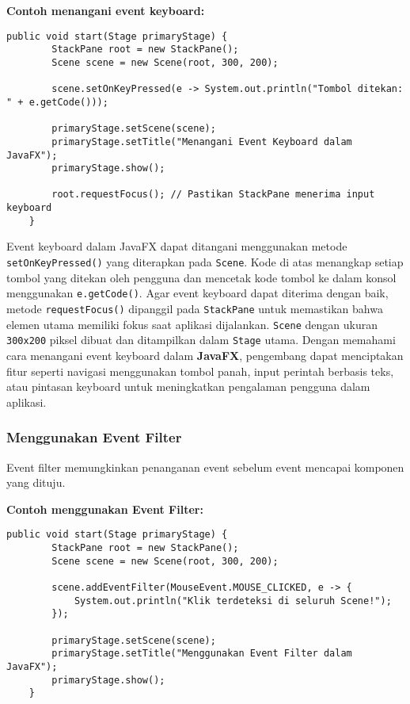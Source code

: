 \textbf{Contoh menangani event keyboard:}
\begin{lstlisting}[style=JavaStyle, caption=Menggunakan event keyboard dalam JavaFX]
	public void start(Stage primaryStage) {
		StackPane root = new StackPane();
		Scene scene = new Scene(root, 300, 200);
		
		scene.setOnKeyPressed(e -> System.out.println("Tombol ditekan: " + e.getCode()));
		
		primaryStage.setScene(scene);
		primaryStage.setTitle("Menangani Event Keyboard dalam JavaFX");
		primaryStage.show();
		
		root.requestFocus(); // Pastikan StackPane menerima input keyboard
	}
\end{lstlisting}

Event keyboard dalam JavaFX dapat ditangani menggunakan metode \texttt{setOnKeyPressed()} yang diterapkan pada \texttt{Scene}. Kode di atas menangkap setiap tombol yang ditekan oleh pengguna dan mencetak kode tombol ke dalam konsol menggunakan \texttt{e.getCode()}. Agar event keyboard dapat diterima dengan baik, metode \texttt{requestFocus()} dipanggil pada \texttt{StackPane} untuk memastikan bahwa elemen utama memiliki fokus saat aplikasi dijalankan. \texttt{Scene} dengan ukuran \texttt{300x200} piksel dibuat dan ditampilkan dalam \texttt{Stage} utama. Dengan memahami cara menangani event keyboard dalam \textbf{JavaFX}, pengembang dapat menciptakan fitur seperti navigasi menggunakan tombol panah, input perintah berbasis teks, atau pintasan keyboard untuk meningkatkan pengalaman pengguna dalam aplikasi.


\subsubsection{Menggunakan Event Filter}

Event filter memungkinkan penanganan event sebelum event mencapai komponen yang dituju.

\textbf{Contoh menggunakan Event Filter:}
\begin{lstlisting}[style=JavaStyle, caption=Menangani event sebelum mencapai target]
	public void start(Stage primaryStage) {
		StackPane root = new StackPane();
		Scene scene = new Scene(root, 300, 200);
		
		scene.addEventFilter(MouseEvent.MOUSE_CLICKED, e -> {
			System.out.println("Klik terdeteksi di seluruh Scene!");
		});
		
		primaryStage.setScene(scene);
		primaryStage.setTitle("Menggunakan Event Filter dalam JavaFX");
		primaryStage.show();
	}
\end{lstlisting}

